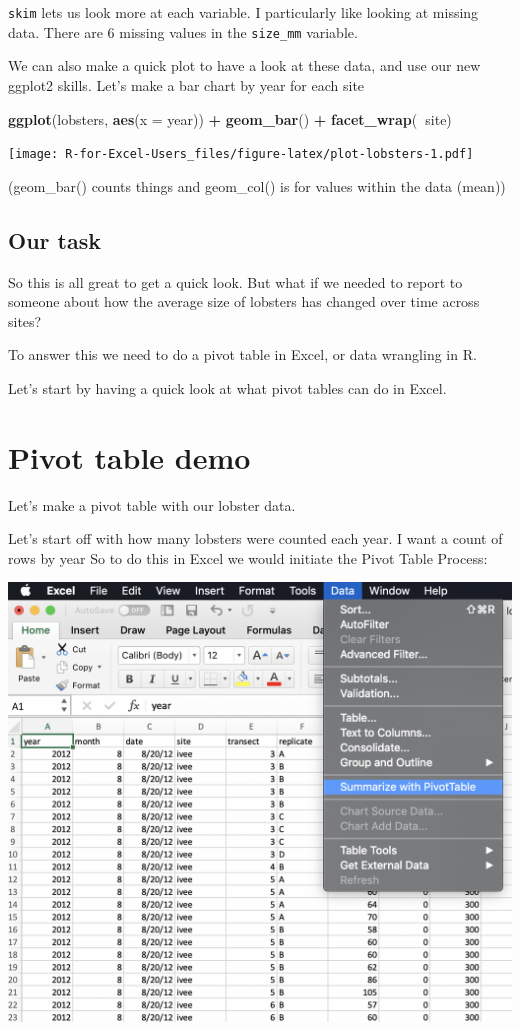 \documentclass[]{book}
\newenvironment{Shaded}{\begin{snugshade}}{\end{snugshade}}
\newcommand{\DataTypeTok}[1]{\textcolor[rgb]{0.13,0.29,0.53}{#1}}
\newcommand{\KeywordTok}[1]{\textcolor[rgb]{0.13,0.29,0.53}{\textbf{#1}}}
\newcommand{\NormalTok}[1]{#1}
\newcommand{\OperatorTok}[1]{\textcolor[rgb]{0.81,0.36,0.00}{\textbf{#1}}}
\newcommand{\StringTok}[1]{\textcolor[rgb]{0.31,0.60,0.02}{#1}}
\begin{document}
\texttt{skim} lets us look more at each variable. I particularly like looking at missing data. There are 6 missing values in the \texttt{size\_mm} variable.

We can also make a quick plot to have a look at these data, and use our new ggplot2 skills. Let's make a bar chart by year for each site

\begin{Shaded}
\begin{Highlighting}[]
\KeywordTok{ggplot}\NormalTok{(lobsters, }\KeywordTok{aes}\NormalTok{(}\DataTypeTok{x =}\NormalTok{ year)) }\OperatorTok{+}
\StringTok{  }\KeywordTok{geom_bar}\NormalTok{() }\OperatorTok{+}
\StringTok{  }\KeywordTok{facet_wrap}\NormalTok{(}\OperatorTok{~}\NormalTok{site)}
\end{Highlighting}
\end{Shaded}

\texttt{[image: R-for-Excel-Users\_files/figure-latex/plot-lobsters-1.pdf]}

(geom\_bar() counts things and geom\_col() is for values within the data (mean))

\hypertarget{our-task}{%
\subsection{Our task}\label{our-task}}

So this is all great to get a quick look. But what if we needed to report to someone about how the average size of lobsters has changed over time across sites?

To answer this we need to do a pivot table in Excel, or data wrangling in R.

Let's start by having a quick look at what pivot tables can do in Excel.

\hypertarget{pivot-table-demo}{%
\section{Pivot table demo}\label{pivot-table-demo}}

Let's make a pivot table with our lobster data.

Let's start off with how many lobsters were counted each year. I want a count of rows by year So to do this in Excel we would initiate the Pivot Table Process:

\includegraphics[width=0.6\linewidth]{img/pivot-table-menu}
\end{document}
